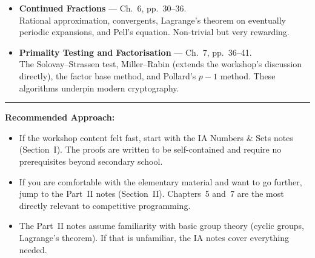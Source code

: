 \documentclass[11pt]{article}
\begin{document}
\begin{itemize}
    \item \textbf{Continued Fractions} --- Ch.~6, pp.~30--36. \\
    Rational approximation, convergents, Lagrange's theorem on eventually periodic expansions, and Pell's equation. Non-trivial but very rewarding.

    \item \textbf{Primality Testing and Factorisation} --- Ch.~7, pp.~36--41. \\
    The Solovay--Strassen test, Miller--Rabin (extends the workshop's discussion directly), the factor base method, and Pollard's $p-1$ method. These algorithms underpin modern cryptography.
\end{itemize}

\vspace{1em}
\hrule
\vspace{1em}

\noindent
\textbf{Recommended Approach:}
\begin{itemize}
    \item If the workshop content felt fast, start with the IA Numbers \& Sets notes (Section~I). The proofs are written to be self-contained and require no prerequisites beyond secondary school.
    \item If you are comfortable with the elementary material and want to go further, jump to the Part~II notes (Section~II). Chapters~5 and~7 are the most directly relevant to competitive programming.
    \item The Part~II notes assume familiarity with basic group theory (cyclic groups, Lagrange's theorem). If that is unfamiliar, the IA notes cover everything needed.
\end{itemize}
\end{document}
